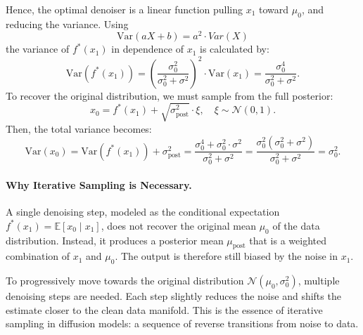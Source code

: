Hence, the optimal denoiser is a linear function pulling \( x_1 \) toward \( \mu_0 \), and reducing the variance.  
Using 
\[
\mathrm{Var}(aX+b) = a^2 \cdot Var(X)
\]
the variance of \( f^*(x_1) \) in dependence of $x_1$ is calculated by:
\[
\mathrm{Var}(f^*(x_1)) = \left( \frac{\sigma_0^2}{\sigma_0^2 + \sigma^2} \right)^2 \cdot \mathrm{Var}(x_1) = \frac{\sigma_0^4}{\sigma_0^2 + \sigma^2}.
\]
To recover the original distribution, we must sample from the full posterior:
\[
x_0 = f^*(x_1) + \sqrt{\sigma_{\text{post}}^2} \cdot \xi, \quad \xi \sim \mathcal{N}(0, 1).
\]
Then, the total variance becomes:
\[
\mathrm{Var}(x_0) = \mathrm{Var}(f^*(x_1)) + \sigma_{\text{post}}^2
= \frac{\sigma_0^4 + \sigma_0^2 \cdot \sigma^2}{\sigma_0^2 + \sigma^2}
= \frac{\sigma_0^2 (\sigma_0^2 + \sigma^2)}{\sigma_0^2 + \sigma^2}
= \sigma_0^2.
\]

\paragraph{Why Iterative Sampling is Necessary.}
A single denoising step, modeled as the conditional expectation \( f^*(x_1) = \mathbb{E}[x_0 \mid x_1] \), does not recover the original mean \( \mu_0 \) of the data distribution. Instead, it produces a posterior mean \( \mu_{\text{post}} \) that is a weighted combination of \( x_1 \) and \( \mu_0 \). The output is therefore still biased by the noise in \( x_1 \).

To progressively move towards the original distribution \( \mathcal{N}(\mu_0, \sigma_0^2) \), multiple denoising steps are needed. Each step slightly reduces the noise and shifts the estimate closer to the clean data manifold. This is the essence of iterative sampling in diffusion models: a sequence of reverse transitions from noise to data.

